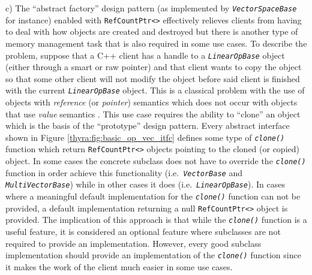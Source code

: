 \documentclass[pdf,ps2pdf,11pt]{SANDreport}
\begin{document}
c) The ``abstract factory'' design pattern (as implemented by
{}\texttt{\textit{Vector\-Space\-Base}} for instance) enabled with
{}\texttt{RefCountPtr<>} effectively relieves clients from having to
deal with how objects are created and destroyed but there is another
type of memory management task that is also required in some use
cases.  To describe the problem, suppose that a C++ client has a
handle to a {}\texttt{\textit{Linear\-Op\-Base}} object (either through a
smart or raw pointer) and that client wants to copy the object so that
some other client will not modify the object before said client is
finished with the current {}\texttt{\textit{Linear\-Op\-Base}} object.  This
is a classical problem with the use of objects with {\em reference}
(or {\em pointer}) semantics which does not occur with objects that
use {\em value} semantics {}\cite{ref:stroustrup_1997}.  This use case
requires the ability to ``clone'' an object which is the basis of the
``prototype'' design pattern.  Every abstract interface shown in
Figure {}\ref{thyra:fig:basic_op_vec_itfc} defines some type of
{}\texttt{\textit{clone()}} function which return
{}\texttt{RefCountPtr<>} objects pointing to the cloned (or copied)
object.  In some cases the concrete subclass does not have to override
the {}\texttt{\textit{clone()}} function in order achieve this
functionality (i.e.~\texttt{\textit{Vector\-Base}} and
{}\texttt{\textit{Multi\-Vector\-Base}}) while in other cases it does
(i.e.~\texttt{\textit{Linear\-Op\-Base}}).  In cases where a meaningful
default implementation for the {}\texttt{\textit{clone()}} function can
not be provided, a default implementation returning a null
{}\texttt{RefCountPtr<>} object is provided.  The implication of this
approach is that while the {}\texttt{\textit{clone()}} function is a
useful feature, it is considered an optional feature where subclasses
are not required to provide an implementation.  However, every good
subclass implementation should provide an implementation of the
{}\texttt{\textit{clone()}} function since it makes the work of the
client much easier in some use cases.
\end{document}
